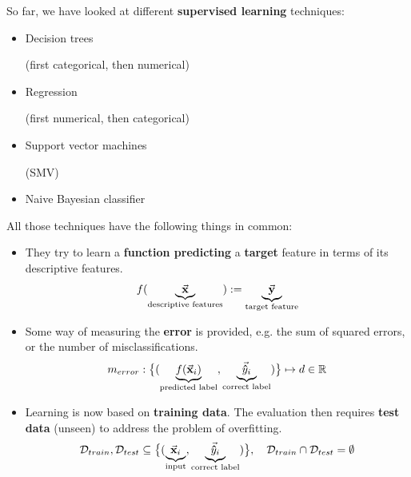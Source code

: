 So far, we have looked at different \textbf{supervised learning} techniques:
\begin{itemize}
  \item Decision trees \begin{note}(first categorical, then numerical)\end{note}
  \item Regression \begin{note}(first numerical, then categorical)\end{note}
  \item Support vector machines \begin{note}(SMV)\end{note}
  \item Naive Bayesian classifier
\end{itemize}

All those techniques have the following things in common:
\begin{itemize}
  \item They try to learn a \textbf{function predicting} a \textbf{target} feature in terms of its descriptive features.
  \begin{align*}
    f(\underbrace{\vec{\mathbf{x}}}_{\textnormal{\color{black}{descriptive features}}}) := \underbrace{\vec{\mathbf{y}}}_{\textnormal{\color{black}{target feature}}}
  \end{align*}
  \item Some way of measuring the \textbf{error} is provided, e.g. the sum of squared errors, or the number of misclassifications.
  \begin{align*}
    m_{error} : \big\{ (\underbrace{f(\vec{\mathbf{x}}_i)}_{\textnormal{\color{black}{predicted label}}}, \underbrace{\vec{\mathbf{\hat{y}}}_i}_{\textnormal{\color{black}{correct label}}}) \big\} \mapsto d \in \mathbb{R}
  \end{align*}
  \item Learning is now based on \textbf{training data}. The evaluation then requires \textbf{test data} (unseen) to address the problem of overfitting.
  \begin{align*}
    \mathcal{D}_{train}, \mathcal{D}_{test} \subseteq \big\{ (\underbrace{\vec{\mathbf{x}}_i}_{\textnormal{\color{black}{input}}}, \underbrace{\vec{\mathbf{\hat{y}}}_i}_{\textnormal{\color{black}{correct label}}}) \big\}, \quad
    \mathcal{D}_{train} \cap \mathcal{D}_{test} = \emptyset
  \end{align*}
\end{itemize}

